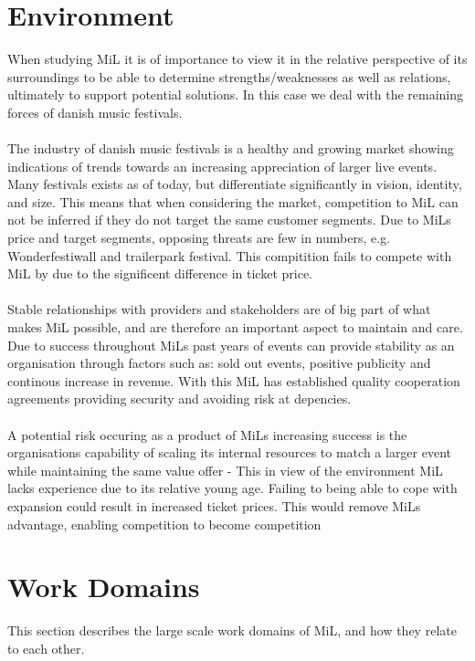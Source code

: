 \section{Environment}
When studying MiL it is of importance to view it in the relative perspective of its surroundings to be able to determine strengths/weaknesses as well as relations, ultimately to support potential solutions. In this case we deal with the remaining forces of danish music festivals.
\\  \\
The industry of danish music festivals is a healthy and growing market showing indications of trends towards an increasing appreciation of larger live events. Many festivals exists as of today, but differentiate significantly in vision, identity, and size. This means that when considering the market, competition to MiL can not be inferred if they do not target the same customer segments. Due to MiLs price and target segments, opposing threats are few in numbers, e.g. Wonderfestiwall and trailerpark festival. This compitition fails to compete with MiL by due to the significent difference in ticket price.
\\  \\
Stable relationships with providers and stakeholders are of big part of what makes MiL possible, and are therefore an important aspect to maintain and care. Due to success throughout MiLs past years of events can provide stability as an organisation through factors such as: sold out events, positive publicity and continous increase in revenue. With this MiL has established quality cooperation agreements providing security and avoiding risk at depencies.
\\  \\
A potential risk occuring as a product of MiLs increasing success is the organisations capability of scaling its internal resources to match a larger event while maintaining the same value offer - This in view of the environment MiL lacks experience due to its relative young age. Failing to being able to cope with expansion could result in increased ticket prices. This would remove MiLs advantage, enabling competition to become competition


\section{Work Domains}
\label{sec:work_domains}
This section describes the large scale work domains of MiL, and how they relate to each other.
